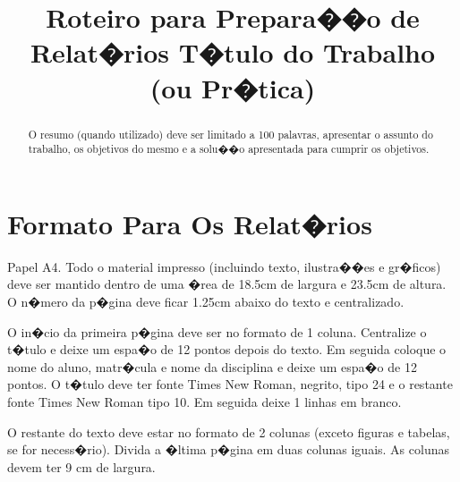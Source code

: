 \documentclass[conference]{IEEEtran}
\begin{document}
\title{Roteiro para Prepara��o de Relat�rios T�tulo do Trabalho (ou Pr�tica)}

\author{
}

\maketitle


\begin{abstract}
O resumo (quando utilizado) deve ser limitado a 100 palavras, apresentar o assunto do trabalho, os objetivos do mesmo e a solu��o apresentada para cumprir os objetivos.
\end{abstract}



%
\IEEEpeerreviewmaketitle



\section{Formato Para Os Relat�rios}
Papel A4. Todo o material impresso (incluindo texto, ilustra��es e gr�ficos) deve ser mantido dentro de uma �rea de 18.5cm de largura e 23.5cm de altura. O n�mero da p�gina deve ficar 1.25cm abaixo do texto e centralizado.

O in�cio da primeira p�gina deve ser no formato de 1 coluna. Centralize o t�tulo e deixe um espa�o de 12 pontos depois do texto. Em seguida coloque o nome do aluno, matr�cula e nome da disciplina e deixe um espa�o de 12 pontos. O t�tulo deve ter fonte Times New Roman, negrito, tipo 24 e o restante fonte Times New Roman tipo 10. Em seguida deixe 1 linhas em branco.

O restante do texto deve estar no formato de 2 colunas (exceto figuras e tabelas, se for necess�rio). Divida a �ltima p�gina em duas colunas iguais. As colunas devem ter 9 cm de largura.
\end{document}
